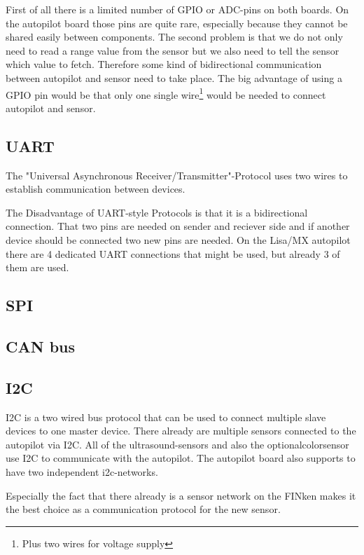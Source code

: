 First of all there is a limited number of GPIO or ADC-pins on both boards.
On the autopilot board those pins are quite rare, especially because they cannot be shared easily between components.
The second problem is that we do not only need to read a range value from the sensor but we also need to tell the sensor which value to fetch.
Therefore some kind of bidirectional communication between autopilot and sensor need to take place.
The big advantage of using a GPIO pin would be that only one single wire\footnote{Plus two wires for voltage supply} would be needed to connect autopilot and sensor.

\subsection{UART}
The "Universal Asynchronous Receiver/Transmitter"-Protocol uses two wires to establish communication between devices.
\cite{wingen_automatic_2004}

The Disadvantage of UART-style Protocols is that it is a bidirectional connection.
That two pins are needed on sender and reciever side and if another device should be connected two new pins are needed.
On the Lisa/MX autopilot there are 4 dedicated UART connections that might be used, but already 3 of them are used.

\subsection{SPI}

\subsection{CAN bus}

\subsection{I2C}
I2C is a two wired bus protocol that can be used to connect multiple slave devices to one master device.
There already are multiple sensors connected to the autopilot via I2C.
All of the ultrasound-sensors and also the optionalcolorsensor use I2C to communicate with the autopilot.
The autopilot board also supports to have two independent i2c-networks.

Especially the fact that there already is a sensor network on the FINken makes it the best choice as a communication protocol for the new sensor.


